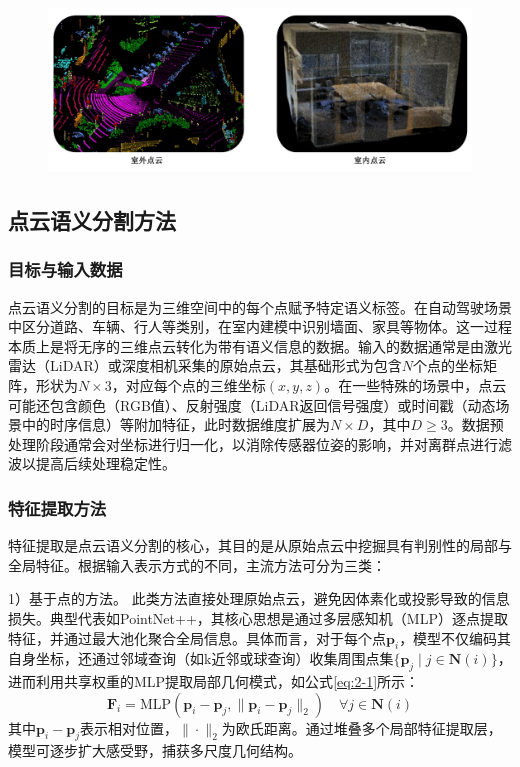 \vspace{-0.1cm}
\begin{figure}[h]
    \centering
    \includegraphics[width = \textwidth, scale=0.5]{ljx/figure/2-1PC.pdf}
    \label{fig:2-1}
\end{figure}
\vspace{-0.35cm}
\subsection{点云语义分割方法}
\subsubsection{目标与输入数据}
点云语义分割的目标是为三维空间中的每个点赋予特定语义标签。在自动驾驶场景中区分道路、车辆、行人等类别，在室内建模中识别墙面、家具等物体。这一过程本质上是将无序的三维点云转化为带有语义信息的数据。输入的数据通常是由激光雷达（LiDAR）或深度相机采集的原始点云，其基础形式为包含$N$个点的坐标矩阵，形状为$N \times 3$，对应每个点的三维坐标$(x, y, z)$。在一些特殊的场景中，点云可能还包含颜色（RGB值）、反射强度（LiDAR返回信号强度）或时间戳（动态场景中的时序信息）等附加特征，此时数据维度扩展为$N \times D$，其中$D \geq 3$。数据预处理阶段通常会对坐标进行归一化，以消除传感器位姿的影响，并对离群点进行滤波以提高后续处理稳定性。

\subsubsection{特征提取方法}
特征提取是点云语义分割的核心，其目的是从原始点云中挖掘具有判别性的局部与全局特征。根据输入表示方式的不同，主流方法可分为三类：

1）基于点的方法。
此类方法直接处理原始点云，避免因体素化或投影导致的信息损失。典型代表如PointNet++，其核心思想是通过多层感知机（MLP）逐点提取特征，并通过最大池化聚合全局信息。具体而言，对于每个点$\mathbf{p}_i$，模型不仅编码其自身坐标，还通过邻域查询（如k近邻或球查询）收集周围点集$\{\mathbf{p}_j \mid j \in \mathbf{N}(i)\}$，进而利用共享权重的MLP提取局部几何模式，如公式\eqref{eq:2-1}所示：
\begin{equation}
    \label{eq:2-1}
    \mathbf{F}_i = \text{MLP}\left(\mathbf{p}_i - \mathbf{p}_j, \|\mathbf{p}_i - \mathbf{p}_j\|_2\right) \quad \forall j \in \mathbf{N}(i)
\end{equation}
其中$\mathbf{p}_i - \mathbf{p}_j$表示相对位置，$\|\cdot\|_2$为欧氏距离。通过堆叠多个局部特征提取层，模型可逐步扩大感受野，捕获多尺度几何结构。


